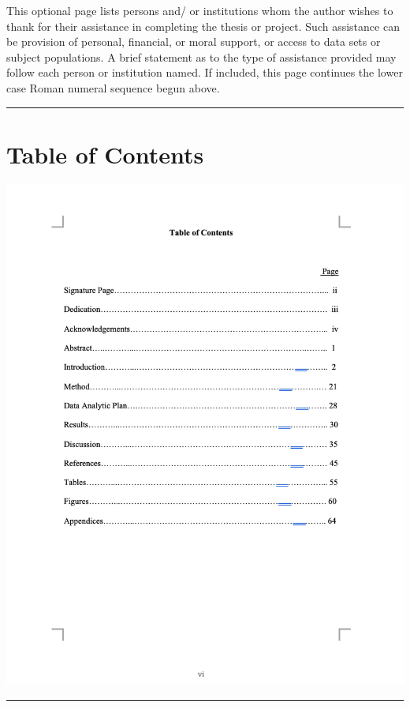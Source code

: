 \documentclass[openany]{book}
\begin{document}
This optional page lists persons and/ or institutions whom the author wishes to thank for their assistance in completing the thesis or project. Such assistance can be provision of personal, financial, or moral support, or access to data sets or subject populations. A brief statement as to the type of assistance provided may follow each person or institution named. If included, this page continues the lower case Roman numeral sequence begun above.

\begin{center}\rule{0.5\linewidth}{0.5pt}\end{center}

\hypertarget{table-of-contents}{%
\section{Table of Contents}\label{table-of-contents}}

\includegraphics{images/tablecontents.png}

\begin{center}\rule{0.5\linewidth}{0.5pt}\end{center}
\end{document}
